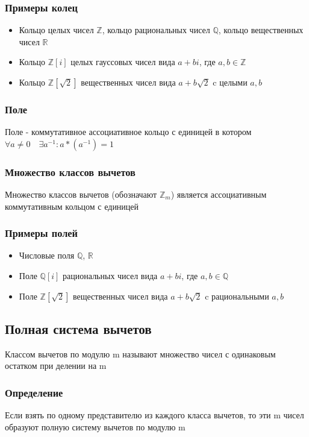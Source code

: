 \documentclass[12pt]{article}
\begin{document}
\subsubsection{Примеры колец}
\begin{itemize}
    \item Кольцо целых чисел $\mathbb{Z}$, кольцо рациональных чисел $\mathbb{Q}$, кольцо вещественных чисел $\mathbb{R}$
    \item Кольцо $\mathbb{Z}[i]$ целых гауссовых чисел вида $a + bi$, где $a,b \in \mathbb{Z}$
    \item Кольцо $\mathbb{Z}[\sqrt{2}]$ вещественных чисел вида $a + b\sqrt{2}$ c целыми $a,b$
\end{itemize}

\subsubsection{Поле}
Поле - коммутативное ассоциативное кольцо с единицей в котором $\forall a \ne 0 \quad \exists a^{-1}: a * (a^{-1}) = 1$

\subsubsection{Множество классов вычетов}
Множество классов вычетов (обозначают $\mathbb{Z}_m$) является ассоциативным коммутативным кольцом с единицей
\subsubsection{Примеры полей}
\begin{itemize}
    \item Числовые поля $\mathbb{Q}$, $\mathbb{R}$
    \item Поле $\mathbb{Q}[i]$ рациональных чисел вида $a + bi$, где $a,b \in \mathbb{Q}$
    \item Поле $\mathbb{Z}[\sqrt{2}]$ вещественных чисел вида $a + b\sqrt{2}$ c рациональными $a,b$
\end{itemize}

\subsection{Полная система вычетов}

Классом вычетов по модулю m называют множество чисел с одинаковым остатком при делении на m
\subsubsection{Определение}
Если взять по одному представителю из каждого класса вычетов, то эти m чисел образуют полную систему вычетов по модулю m
\end{document}
